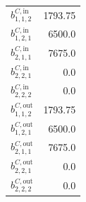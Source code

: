 \documentclass{article}%
\begin{document}
\begin{multicols*}{3}
\begin{supertabular}{lr}
	$b_{1,1,2}^{C,\text{in}}$ & 1793.75 \\%
	$b_{1,2,1}^{C,\text{in}}$ & 6500.0 \\%
	$b_{2,1,1}^{C,\text{in}}$ & 7675.0 \\%
	$b_{2,2,1}^{C,\text{in}}$ & 0.0 \\%
	$b_{2,2,2}^{C,\text{in}}$ & 0.0 \\%
	$b_{1,1,2}^{C,\text{out}}$ & 1793.75 \\%
	$b_{1,2,1}^{C,\text{out}}$ & 6500.0 \\%
	$b_{2,1,1}^{C,\text{out}}$ & 7675.0 \\%
	$b_{2,2,1}^{C,\text{out}}$ & 0.0 \\%
	$b_{2,2,2}^{C,\text{out}}$ & 0.0 \\%
\end{supertabular}%
\end{multicols*}%
\end{document}
